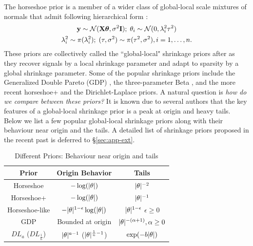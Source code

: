 \documentclass[11pt]{article}
\numberwithin{equation}{section}
\begin{document}
%
The horseshoe prior is a member of a wider class of global-local scale mixtures of normals that admit following hierarchical form \citep{polson2010shrink}: 
\begin{gather*}
{\bf y} \sim {\cal N}({\bf X} \boldsymbol{\theta}, \sigma^2 {\bf I}) ;\; \theta_i \sim {\cal N}(0, \lambda_i^2 \tau^2) \\
\lambda_i^2 \sim \pi(\lambda_i^2) ; \; (\tau,\sigma^2) \sim  \pi(\tau^2,\sigma^2), i = 1, \ldots, n. 
\end{gather*}
These priors are collectively called the ``global-local" shrinkage priors after \cite{polson2010shrink} as they recover signals by a local shrinkage parameter and adapt to sparsity by a global shrinkage parameter. Some of the popular shrinkage priors include the Generalized Double Pareto (GDP) \citep{armagan2013generalized}, the three-parameter Beta \citep{armagan2011generalized}, and the more recent horseshoe+ \citep{bhadra2015horseshoe+} and the Dirichlet-Laplace \citep{bhattacharya2014dirichlet} priors. A natural question is \textit{how do we compare between these priors?} It is known due to several authors \citep[e.g.]{polson2010shrink,bhadra2015default,van2015conditions} that the key features of a global-local shrinkage prior is a peak at origin and heavy tails. Below we list a few popular global-local shrinkage priors along with their behaviour near origin and the tails. A detailed list of shrinkage priors proposed in the recent past is deferred to \S \ref{sec:app-ext}.

\begin{table}%
\centering
\begin{tabular}{| c | c |c |}
\hline
Prior & Origin Behavior & Tails \\
\hline 
Horseshoe & $-\log(\lvert\theta\rvert)$ & $\lvert\theta\rvert^{-2}$ \\
Horseshoe+ & $-\log(\lvert\theta\rvert)$ & $\lvert\theta\rvert^{-1}$ \\
Horseshoe-like & $-\lvert\theta\rvert^{1-\epsilon}\log(\lvert\theta\rvert)$ & $\lvert\theta\rvert^{1-\epsilon}$ $\epsilon \ge 0$\\
GDP & Bounded at origin & $\lvert\theta\rvert^{-(\alpha + 1)}, \alpha \ge 0$ \\
$DL_{a}$ ($DL_{\frac{1}{n}}$) & $\lvert\theta\rvert^{a-1}$ ($\lvert\theta\rvert^{\frac{1}{n}-1}$) & $\exp(-b\lvert\theta\rvert)$ \\
\hline
\end{tabular}
\caption{Different Priors: Behaviour near origin and tails}
\label{tab:priors}
\end{table}
\end{document}
